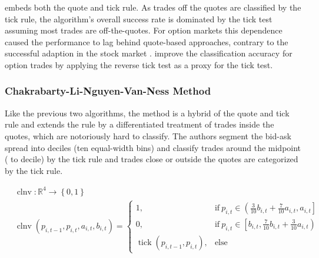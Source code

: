  embeds both the quote and tick rule. As trades off the quotes are classified by the tick rule, the algorithm's overall success rate is dominated by the tick test assuming most trades are off-the-quotes. For option markets \autocites[cp.][891]{savickasInferringDirectionOption2003}[][21]{grauerOptionTradeClassification2022} this dependence caused the performance to lag behind quote-based approaches, contrary to the successful adaption in the stock market \autocites[cp.][541]{ellisAccuracyTradeClassification2000}[][3818]{chakrabartyTradeClassificationAlgorithms2007}. \textcite[][31--35]{grauerOptionTradeClassification2022} improve the classification accuracy for option trades by applying the reverse tick test as a proxy for the tick test.

\subsubsection{Chakrabarty-Li-Nguyen-Van-Ness
  Method}\label{sec:chakarabarty-li-nguyen-van-ness-method}

Like the previous two algorithms, the  method \autocite[][3809]{chakrabartyTradeClassificationAlgorithms2012} is a hybrid of the quote and tick rule and extends the  rule by a differentiated treatment of trades inside the quotes, which are notoriously hard to classify. The authors segment the bid-ask spread into deciles (ten equal-width bins) and classify trades around the midpoint ( to  decile) by the tick rule and trades close or outside the quotes are categorized by the tick rule.

\begin{equation}
  \begin{aligned}
  &\operatorname{clnv} \colon \mathbb{R}^4 \to \left\{0, 1 \right\}\\
  &\operatorname{clnv}(p_{i, t-1}, p_{i, t}, a_{i, t}, b_{i, t})=
  \begin{cases}
    1,                     & \text{if}\ p_{i, t} \in \left(\frac{3}{10} b_{i,t} + \frac{7}{10} a_{i,t}, a_{i, t}\right] \\
    0,                     & \text{if}\ p_{i, t} \in \left[ b_{i,t}, \frac{7}{10} b_{i,t} + \frac{3}{10} a_{i,t}\right) \\
    \operatorname{tick}(p_{i, t-1}, p_{i, t}), & \text{else}
  \end{cases}
  \end{aligned}
  \label{eq:CLNV-rule}
\end{equation}

